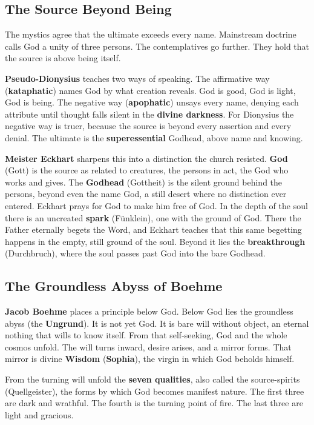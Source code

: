 \subsection{The Source Beyond Being}

The mystics agree that the ultimate exceeds every name. Mainstream doctrine
calls God a unity of three persons. The contemplatives go further. They hold
that the source is above being itself.

\textbf{Pseudo-Dionysius} teaches two ways of speaking. The
affirmative way (\textbf{kataphatic}) names God by what creation reveals. God
is good, God is light, God is being. The negative way (\textbf{apophatic})
unsays every name, denying each attribute until thought falls silent in the
\textbf{divine darkness}. For Dionysius the negative way is truer, because the
source is beyond every assertion and every denial. The ultimate is the
\textbf{superessential} Godhead, above name and knowing.

\textbf{Meister Eckhart} sharpens this into a distinction the church resisted.
\textbf{God} (Gott) is the source as related to creatures, the persons in act,
the God who works and gives. The \textbf{Godhead} (Gottheit) is the silent
ground behind the persons, beyond even the name God, a still desert where no
distinction ever entered. Eckhart prays for God to make him free of God. In
the depth of the soul there is an uncreated \textbf{spark} (Fünklein), one with
the ground of God. There the Father eternally begets the Word, and Eckhart
teaches that this same begetting happens in the empty, still ground of the
soul. Beyond it lies the \textbf{breakthrough} (Durchbruch), where the soul
passes past God into the bare Godhead.

\subsection{The Groundless Abyss of Boehme}

\textbf{Jacob Boehme} places a principle below God. Below God lies the
groundless abyss (the \textbf{Ungrund}). It is not yet God. It is bare will
without object, an eternal nothing that wills to know itself. From that
self-seeking, God and the whole cosmos unfold. The will turns inward, desire
arises, and a mirror forms. That mirror is divine \textbf{Wisdom}
(\textbf{Sophia}), the virgin in which God beholds himself.

From the turning will unfold the \textbf{seven qualities}, also called the
source-spirits (Quellgeister), the forms by which God becomes manifest nature.
The first three are dark and wrathful. The fourth is the turning point of fire.
The last three are light and gracious.

